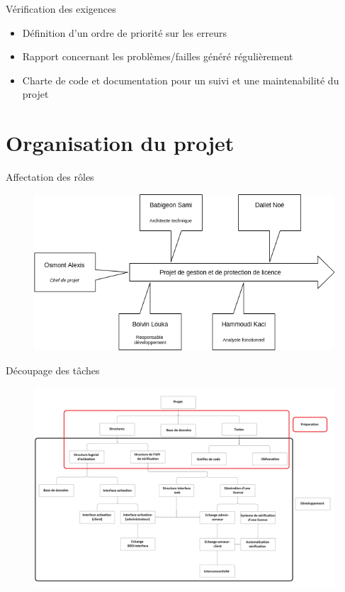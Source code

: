 \documentclass{cubeamer}
\begin{document}
\begin{frame}{Vérification des exigences}
    \begin{itemize}
        \item Définition d'un ordre de priorité sur les erreurs
        \item Rapport concernant les problèmes/failles généré régulièrement
        \item Charte de code et documentation pour un suivi et une maintenabilité du projet
    \end{itemize}
\end{frame}

\section{Organisation du projet} %

\begin{frame}{Affectation des rôles}
    \begin{figure}
        \centering
        \includegraphics[scale=0.55]{img/schema_role_projet.png}
    \end{figure}
\end{frame}

\begin{frame}{Découpage des tâches}
    \begin{figure}
        \centering
        \includegraphics[scale=0.18]{img/organi.png}
    \end{figure}
\end{frame}
\end{document}
